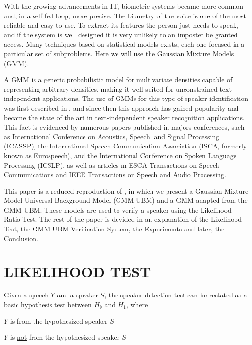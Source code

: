 \documentclass[a4paper,twocolumn]{article}
\begin{document}
With the growing advancements in IT, biometric systems became more common and, in a self fed loop, more precise. The biometry of the voice is one of the most reliable and easy to use. To extract its features the person just needs to speak, and if the system is well designed it is very unlikely to an imposter be granted access. Many techniques based on statistical models exists, each one focused in a particular set of subproblems. Here we will use the Gaussian Mixture Models (GMM).

A GMM is a generic probabilistic model for multivariate densities capable of representing arbitrary densities, making it well suited for unconstrained text-independent applications. The use of GMMs for this type of speaker identification was first described in \cite{rose_reynolds_1990}, and since then this approach has gained popularity and became the state of the art in text-independent speaker recognition applications. This fact is evidenced by numerous papers published in majors conferences, such as International Conference on Acoustics, Speech, and Signal Processing (ICASSP), the International Speech Communication Association (ISCA, formerly known as Eurospeech), and the International Conference on Spoken Language Processing (ICSLP), as well as articles in ESCA Transactions on Speech Communications and IEEE Transactions on Speech and Audio Processing.

This paper is a reduced reproduction of \cite{reynolds_et_al_2000}, in which we present a Gaussian Mixture Model-Universal Background Model (GMM-UBM) and a GMM adapted from the GMM-UBM. These models are used to verify a speaker using the Likelihood-Ratio Test. The rest of the paper is devided in an explanation of the Likelihood Test, the GMM-UBM Verification System, the Experiments and later, the Conclusion.


\section{LIKELIHOOD TEST}
\label{likelihood_test}

Given a speech $Y$ and a speaker $S$, the speaker detection test can be restated as a basic hypothesis test between $H_0$ and $H_1$, where

\begin{description}\itemsep 0pt \parskip 1pt
    \item[$H_0$:] $Y$ is from the hypothesized speaker $S$
    \item[$H_1$:] $Y$ is \underline{not} from the hypothesized speaker $S$
\end{description}
\end{document}
